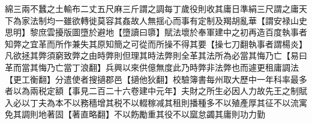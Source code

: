 綿三兩不蠶之土輸布二丈五尺麻三斤謂之調每丁歲役則收其庸日準絹三尺謂之庸天下為家法制均一雖欲轉徙莫容其姦故人無揺心而事有定制及羯胡亂華【謂安禄山史思明】黎庶雲擾版圖墮於避地【墮讀曰隳】賦法壞於奉軍建中之初再造百度執事者知弊之宜革而所作兼失其原知簡之可從而所操不得其要【操七刀翻執事者謂楊炎】凡欲拯其弊須窮致弊之由時弊則但理其時法弊則全革其法所為必當其悔乃亡【易曰革而當其悔乃亡當丁浪翻】兵興以來供億無度此乃時弊非法弊也而遽更租庸調法【更工衡翻】分遣使者搜擿郡邑【擿他狄翻】校驗簿書每州取大歷中一年科率最多者以為兩税定額【事見二百二十六卷建中元年】夫財之所生必因人力故先王之制賦入必以丁夫為本不以務穡增其税不以輟稼减其租則播種多不以殖產厚其征不以流寓免其調則地著固【著直略翻】不以飭勵重其役不以窳怠蠲其庸則功力勤